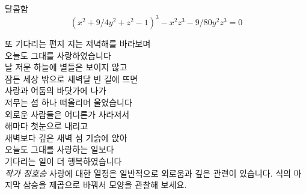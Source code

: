 \begin{surferPage}{달콤함}
\smallskip
\[(x^2+ 9/4y^2	+ z^2- 1)^3- x^2z^3	- 9/80y^2z^3	= 0\]

\singlespacing
또 기다리는 편지
\singlespacing
지는 저녁해를 바라보며\\
오늘도 그대를 사랑하였습니다\\
날 저문 하늘에 별들은 보이지 않고\\
잠든 세상 밖으로 새벽달 빈 길에 뜨면\\
사랑과 어둠의 바닷가에 나가\\
저무는 섬 하나 떠올리며 울었습니다\\
외로운 사람들은 어디론가 사라져서\\
해마다 첫눈으로 내리고\\
새벽보다 깊은 새벽 섬 기슭에 앉아\\
오늘도 그대를 사랑하는 일보다\\
기다리는 일이 더 행복하였습니다\\
{\it 작가 정호승}
\singlespacing 
사랑에 대한 열정은 일반적으로 외로움과 깊은 관련이 있습니다. 
\singlespacing 
식의 마지막 삼승을 제곱으로 바꿔서 모양을 관찰해 보세요.
\end{surferPage}

